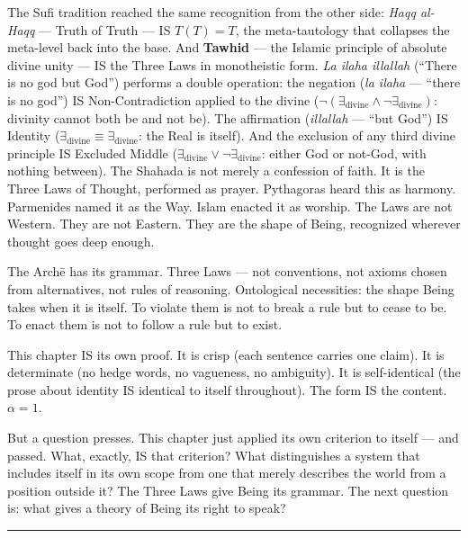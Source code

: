 \documentclass[10pt, openany, oneside]{book}
\begin{document}
The Sufi tradition reached the same recognition from the other side: \textit{Haqq al-Haqq} --- Truth of Truth --- IS $T(T) = T$, the meta-tautology that collapses the meta-level back into the base. And \textbf{Tawhid} --- the Islamic principle of absolute divine unity --- IS the Three Laws in monotheistic form. \textit{La ilaha illallah} (``There is no god but God'') performs a double operation: the negation (\textit{la ilaha} --- ``there is no god'') IS Non-Contradiction applied to the divine ($\neg(\exists_{\text{divine}} \wedge \neg\exists_{\text{divine}})$: divinity cannot both be and not be). The affirmation (\textit{illallah} --- ``but God'') IS Identity ($\exists_{\text{divine}} \equiv \exists_{\text{divine}}$: the Real is itself). And the exclusion of any third divine principle IS Excluded Middle ($\exists_{\text{divine}} \vee \neg\exists_{\text{divine}}$: either God or not-God, with nothing between). The Shahada is not merely a confession of faith. It is the Three Laws of Thought, performed as prayer. Pythagoras heard this as harmony. Parmenides named it as the Way. Islam enacted it as worship. The Laws are not Western. They are not Eastern. They are the shape of Being, recognized wherever thought goes deep enough.

\vspace{2em}

The Arch\={e} has its grammar. Three Laws --- not conventions, not axioms chosen from alternatives, not rules of reasoning. Ontological necessities: the shape Being takes when it is itself. To violate them is not to break a rule but to cease to be. To enact them is not to follow a rule but to exist.

This chapter IS its own proof. It is crisp (each sentence carries one claim). It is determinate (no hedge words, no vagueness, no ambiguity). It is self-identical (the prose about identity IS identical to itself throughout). The form IS the content. $\alpha = 1$.

But a question presses. This chapter just applied its own criterion to itself --- and passed. What, exactly, IS that criterion? What distinguishes a system that includes itself in its own scope from one that merely describes the world from a position outside it? The Three Laws give Being its grammar. The next question is: what gives a theory of Being its right to speak?

\vspace{2em}

\begin{center}
    \rule{0.15\textwidth}{0.3pt}
\end{center}
\end{document}
